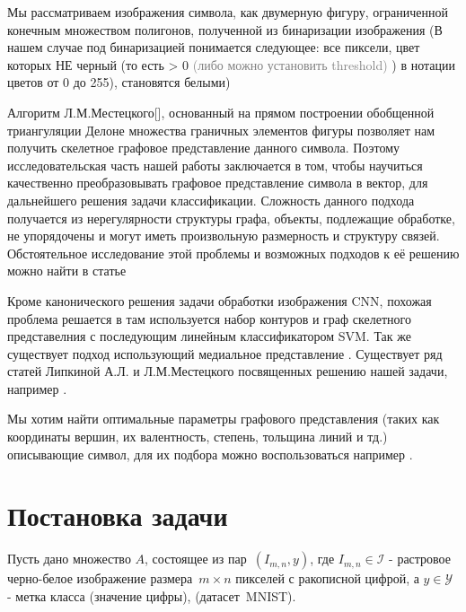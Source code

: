 \documentclass[12pt, twoside]{article}
\begin{document}
Мы рассматриваем изображения символа, как двумерную фигуру, ограниченной конечным множеством полигонов, полученной из бинаризации изображения (В нашем случае под бинаризацией понимается следующее: все пиксели, цвет которых НЕ черный (то есть > 0 \textcolor{gray}{(либо можно установить threshold)} ) в нотации цветов от 0 до 255), становятся белыми)

Алгоритм Л.М.Местецкого[], основанный на прямом построении обобщенной триангуляции Делоне множества граничных элементов фигуры позволяет нам получить скелетное графовое представление данного символа. Поэтому исследовательская часть нашей работы заключается в том, чтобы научиться качественно преобразовывать графовое представление символа в вектор, для дальнейшего решения задачи классификации. Сложность данного подхода получается из нерегулярности структуры графа, объекты, подлежащие обработке, не упорядочены и могут иметь произвольную размерность и структуру связей. Обстоятельное исследование этой проблемы и возможных подходов к её решению можно найти в статье \cite{going_beyond_Euclidean_data} %

Кроме канонического решения задачи обработки изображения CNN, похожая проблема решается в \cite{solution_by_SVM_classifier} там используется набор контуров и граф скелетного представелния с последующим линейным классификатором SVM. Так же существует подход использующий медиальное представление \cite{solution_by_Medial_Representation_GCNN}. Существует ряд статей Липкиной А.Л. и Л.М.Местецкого посвященных решению нашей задачи, например \cite{Lipkina_Mestetskiy_1} \cite{Lipkina_Mestetskiy_2}.

Мы хотим найти оптимальные параметры графового представления (таких как координаты вершин, их валентность, степень, тольщина линий и тд.) описывающие символ, для их подбора можно воспользоваться например \cite{Structural_functional_analisys}.
\section{Постановка задачи}
Пусть дано множество $A$, состоящее из пар~$(I_{m,n}, y)$, где $I_{m,n} \in \mathcal{I}$ - растровое черно-белое изображение размера~$m\times n$ пикселей с ракописной цифрой, а $y \in \mathcal{Y}$ - метка класса (значение цифры), (датасет~MNIST). 
\end{document}

